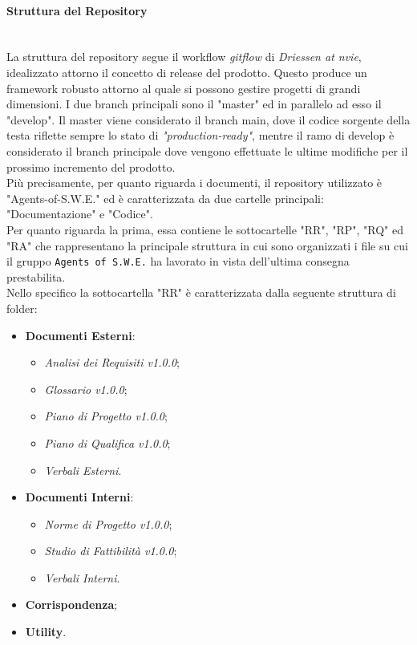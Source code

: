 \paragraph{Struttura del Repository} \-\\
La struttura del repository segue il workflow \textit{gitflow} di \textit{Driessen at nvie}, idealizzato attorno il concetto di release del prodotto. Questo produce un framework robusto attorno al quale si possono gestire progetti di grandi dimensioni. I due branch principali sono il "master" ed in parallelo ad esso il "develop".
Il master viene considerato il branch main, dove il codice sorgente della testa riflette sempre lo stato di \textit{"production-ready"},
mentre il ramo di develop è considerato il branch principale dove vengono effettuate le ultime modifiche per il prossimo incremento del prodotto.\\
Più precisamente, per quanto riguarda i documenti, il repository utilizzato è "Agents-of-S.W.E." ed è caratterizzata da due cartelle principali: "Documentazione" e "Codice".\\
Per quanto riguarda la prima, essa contiene le sottocartelle "RR", "RP", "RQ" ed "RA" che rappresentano la principale struttura in cui sono organizzati i file su cui il gruppo \texttt{Agents of S.W.E.} ha lavorato in vista dell'ultima consegna prestabilita.\\
	Nello specifico la sottocartella "RR" è caratterizzata dalla seguente struttura di folder:
	\begin{itemize}
	\item \textbf{Documenti Esterni}:
		\begin{itemize}
		\item \textit{Analisi dei Requisiti v1.0.0};
		\item \textit{Glossario v1.0.0};
		\item \textit{Piano di Progetto v1.0.0};
		\item \textit{Piano di Qualifica v1.0.0};
		\item \textit{Verbali Esterni}.
		\end{itemize}
	\item \textbf{Documenti Interni}:
		\begin{itemize}
		\item \textit{Norme di Progetto v1.0.0};
		\item \textit{Studio di Fattibilità v1.0.0};
		\item \textit{Verbali Interni}.
		\end{itemize}
	\item \textbf{Corrispondenza};
	\item \textbf{Utility}.
	\end{itemize}
